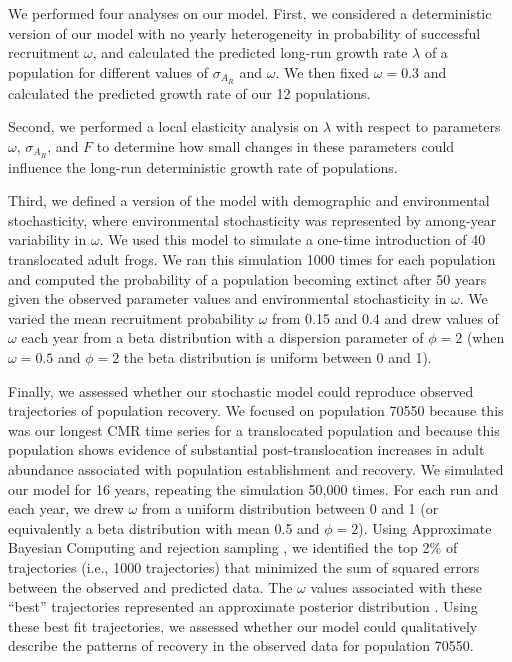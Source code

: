 \documentclass[9pt,twocolumn,twoside,lineno]{pnas-new}
\begin{document}
{We performed four analyses on our model. First, we considered a
deterministic version of our model with no yearly heterogeneity in
probability of successful recruitment \(\omega\), and calculated the
predicted long-run growth rate \(\lambda\) of a population for different
values of \(\sigma_{A_R}\) and \(\omega\). We then fixed
\(\omega = 0.3\) and calculated the predicted growth rate of our 12
populations.

Second, we performed a local elasticity analysis on \(\lambda\) with
respect to parameters \(\omega\), \(\sigma_{A_R}\), and \(F\) to
determine how small changes in these parameters could influence the
long-run deterministic growth rate of populations.

Third, we defined a version of the model with demographic and
environmental stochasticity, where environmental stochasticity was
represented by among-year variability in \(\omega\). We used this model
to simulate a one-time introduction of 40 translocated adult frogs. We
ran this simulation 1000 times for each population and computed the
probability of a population becoming extinct after 50 years given the
observed parameter values and environmental stochasticity in \(\omega\).
We varied the mean recruitment probability \(\omega\) from 0.15 and 0.4
and drew values of \(\omega\) each year from a beta distribution with a
dispersion parameter of \(\phi = 2\) (when \(\omega = 0.5\) and
\(\phi = 2\) the beta distribution is uniform between 0 and 1).

Finally, we assessed whether our stochastic model could reproduce
observed trajectories of population recovery. We focused on population
70550 because this was our longest CMR time series for a translocated
population and because this population shows evidence of substantial
post-translocation increases in adult abundance associated with
population establishment and recovery. We simulated our model for 16
years, repeating the simulation 50,000 times. For each run and each
year, we drew \(\omega\) from a uniform distribution between 0 and 1 (or
equivalently a beta distribution with mean 0.5 and \(\phi = 2\)). Using
Approximate Bayesian Computing and rejection sampling
\citep{kosmala2016}, we identified the top 2\% of trajectories (i.e.,
1000 trajectories) that minimized the sum of squared errors between the
observed and predicted data. The \(\omega\) values associated with these
``best'' trajectories represented an approximate posterior distribution
\citep{beaumont2010}. Using these best fit trajectories, we assessed
whether our model could qualitatively describe the patterns of recovery
in the observed data for population 70550.}
\end{document}

